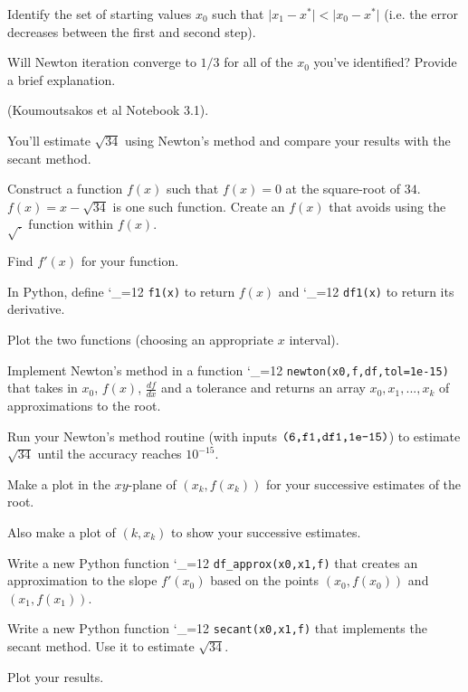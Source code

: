 \documentclass[12pt,letterpaper,noanswers]{exam}
\makeatletter
\newcommand{\pyf}{%
  \begingroup\catcode`_=12
  \pyf@
}
\newcommand{\pyf@}[1]{\texttt{#1}\endgroup}
\makeatother
\begin{document}
\begin{questions}
\begin{parts}
\item Identify the set of starting values $x_0$ such that $\vert x_1 - x^*\vert < \vert x_0 - x^*\vert$ (i.e. the error decreases between the first and second step).

Will Newton iteration converge to $1/3$ for all of the $x_0$ you've identified?  Provide a brief explanation.
\end{parts}


\item (Koumoutsakos et al Notebook 3.1). 

You'll estimate $\sqrt{34}$ using Newton's method and compare your results with the secant method.
\begin{parts}
\item Construct a function $f(x)$ such that $f(x) = 0$ at the square-root of $34$.  $f(x) = x - \sqrt{34}$ is one such function.  Create an $f(x)$ that avoids using the $\sqrt{.}$ function within $f(x)$.

Find $f'(x)$ for your function.

\item In Python, define \pyf{f1(x)} to return $f(x)$ and \pyf{df1(x)} to return its derivative.  

Plot the two functions (choosing an appropriate $x$ interval).

\item Implement Newton's method in a function \pyf{newton(x0,f,df,tol=1e-15)} that takes in $x_0$, $f(x)$, $\frac{df}{dx}$ and a tolerance and returns an array $x_0, x_1, ..., x_k$ of approximations to the root.

\item Run your Newton's method routine (with inputs $\pyf{(6,f1,df1,1e-15)}$) to estimate $\sqrt{34}$ until the accuracy reaches $10^{-15}$.  

Make a plot in the $xy$-plane of $(x_k,f(x_k))$ for your successive estimates of the root.

Also make a plot of $(k,x_k)$ to show your successive estimates.

\item Write a new Python function \pyf{df_approx(x0,x1,f)} that creates an approximation to the slope $f'(x_0)$ based on the points $(x_0,f(x_0))$ and $(x_1,f(x_1))$.

\item Write a new Python function \pyf{secant(x0,x1,f)} that implements the secant method.  Use it to estimate $\sqrt{34}$.


Plot your results.


\end{parts}
\end{questions}
\end{document}
